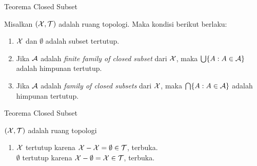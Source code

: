 \begin{frame}{Teorema Closed Subset}
    \begin{tcolorbox}[enhanced,title=Teorema 1.18, frame style tile={width=\paperwidth}{\wallpaper}]
        Misalkan $(\mathcal{X},\mathcal{T})$ adalah ruang topologi. Maka kondisi berikut berlaku:
        \begin{enumerate}
            \item $\mathcal{X}$ dan $\emptyset  $ adalah subset tertutup.
            \item Jika $\mathcal{A}$ adalah \textit{finite family of closed subset} dari $\mathcal{X}$, maka
            $\bigcup\{A:A\in\mathcal{A}\}$ adalah himpunan tertutup.
            \item Jika $\mathcal{A}$ adalah \textit{family of closed subsets} dari $\mathcal{X}$, maka
            $\bigcap\{A:A\in\mathcal{A}\}$ adalah himpunan tertutup.
        \end{enumerate}
    \end{tcolorbox}
\end{frame}

\begin{frame}{Teorema Closed Subset}
    \begin{tcolorbox}[enhanced,title=Teorema 1.18, frame style tile={width=\paperwidth}{\wallpaper}]
        $(\mathcal{X},\mathcal{T})$ adalah ruang topologi
        \begin{enumerate}
            \item $\mathcal{X}$ tertutup karena $\mathcal{X}-\mathcal{X} = \emptyset \in \mathcal{T}$, terbuka.\\
            $\emptyset$ tertutup karena $\mathcal{X}-\emptyset = \mathcal{X} \in \mathcal{T}$, terbuka.
        \end{enumerate}
    \end{tcolorbox}
\end{frame}